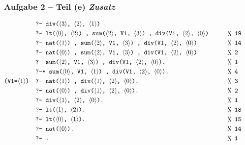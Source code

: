 \documentclass{beamer}
\newcommand{\num}[1]{\ensuremath{\langle #1 \rangle}}
\begin{document}
\begin{frame} \frametitle{Aufgabe 2 -- Teil (e) \hfill \textit{Zusatz}}
	\scriptsize
	\begin{alignat*}{2}
		&\texttt{?- div(\num{3}, \num{2}, \num{1})} \\
		&\texttt{?- lt(\num{0}, \num{2}) , sum(\num{2}, V1, \num{3}) , div(V1, \num{2}, \num{0})} \qquad && \texttt{\% 19 } \\
		&\texttt{?- nat(\num{1}) , sum(\num{2}, V1, \num{3}) , div(V1, \num{2}, \num{0})}  && \texttt{\% 14} \\
		&\texttt{?- nat(\num{0}) , sum(\num{2}, V1, \num{3}) , div(V1, \num{2}, \num{0})} && \texttt{\% 2} \\
		&\texttt{?- sum(\num{2}, V1, \num{3}) , div(V1, \num{2}, \num{0}).} && \texttt{\% 1} \\
		&\texttt{?-* sum(\num{0}, V1, \num{1}) , div(V1, \num{2}, \num{0}).} && \texttt{\% 4} \\
		\texttt{\{V1=\num{1}\}} \quad &\texttt{?- nat(\num{1}) , div(\num{1}, \num{2}, \num{0}).} && \texttt{\% 3} \\
		&\texttt{?- nat(\num{0}) , div(\num{1}, \num{2}, \num{0}).} \quad && \texttt{\% 2} \\
		&\texttt{?- div(\num{1}, \num{2}, \num{0}).} && \texttt{\% 1} \\
		&\texttt{?- lt(\num{1}, \num{2}).} &&\texttt{\% 18} \\
		&\texttt{?- lt(\num{0}, \num{1}).} &&\texttt{\% 15} \\
		&\texttt{?- nat(\num{0}).} &&\texttt{\% 14} \\
		&\texttt{?- .} &&\texttt{\% 1} \\
	\end{alignat*}
\end{frame}
\end{document}
